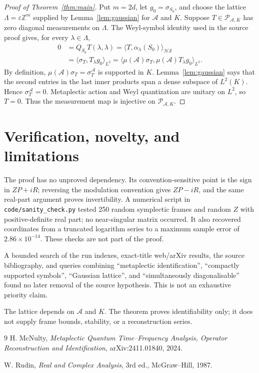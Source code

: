 \documentclass[11pt]{article}
\newcommand{\Z}{\mathbb Z}
\newcommand{\HS}{\mathcal{HS}}
\begin{document}
\begin{proof}[Proof of Theorem~\ref{thm:main}]
Put \(m=2d\), let \(g_0=\sigma_{S_0}\), and choose the lattice
\(\Lambda=\varepsilon\Z^m\) supplied by Lemma~\ref{lem:gaussian} for
\(\mathcal A\) and \(K\).  Suppose \(T\in\mathcal P_{\mathcal A,K}\)
has zero diagonal measurements on \(\Lambda\).  The Weyl-symbol identity
used in the source proof gives, for every \(\lambda\in\Lambda\),
\begin{align*}
 0
 &=Q_{S_0}T(\lambda,\lambda)
   =\langle T,\alpha_\lambda(S_0)\rangle_{\HS}\\
 &=\langle\sigma_T,T_\lambda g_0\rangle_{L^2}
   =\langle\mu(\mathcal A)\sigma_T,
            \mu(\mathcal A)T_\lambda g_0\rangle_{L^2}.
\end{align*}
By definition,
\(\mu(\mathcal A)\sigma_T=\sigma_T^{\mathcal A}\) is supported in
\(K\).  Lemma~\ref{lem:gaussian} says that the second entries in the last
inner products span a dense subspace of \(L^2(K)\).  Hence
\(\sigma_T^{\mathcal A}=0\).  Metaplectic action and Weyl quantization are
unitary on \(L^2\), so \(T=0\).  Thus the measurement map is injective on
\(\mathcal P_{\mathcal A,K}\).
\end{proof}

\section{Verification, novelty, and limitations}

The proof has no unproved dependency.  Its convention-sensitive point is the
sign in \(ZP+iR\); reversing the modulation convention gives \(ZP-iR\), and
the same real-part argument proves invertibility.  A numerical script in
\texttt{code/sanity\_check.py} tested 250 random symplectic frames and random
\(Z\) with positive-definite real part; no near-singular matrix occurred.  It
also recovered coordinates from a truncated logarithm series to a maximum
sample error of \(2.86\times10^{-14}\).  These checks are not part of the
proof.

A bounded search of the run indexes, exact-title web/arXiv results, the source
bibliography, and queries combining ``metaplectic identification'', ``compactly
supported symbols'', ``Gaussian lattice'', and ``simultaneously
diagonalisable'' found no later removal of the source hypothesis.  This is not
an exhaustive priority claim.

The lattice depends on \(\mathcal A\) and \(K\).  The theorem proves
identifiability only; it does not supply frame bounds, stability, or a
reconstruction series.

\begin{thebibliography}{9}
H. McNulty,
\emph{Metaplectic Quantum Time--Frequency Analysis, Operator Reconstruction
and Identification}, arXiv:2411.01840, 2024.

W. Rudin,
\emph{Real and Complex Analysis}, 3rd ed., McGraw--Hill, 1987.
\end{thebibliography}
\end{document}
